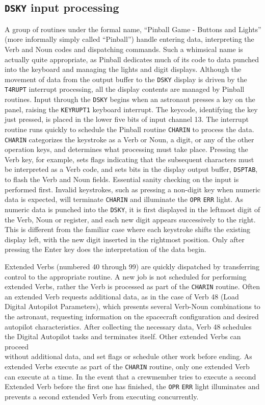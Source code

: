 \documentclass[refcap, oxford]{ahsan}
\begin{document}
\subsection{\texttt{DSKY} input processing}
A group of routines under the formal name, ``Pinball Game - Buttons and Lights'' (more informally simply called ``Pinball'') handle entering data, interpreting the Verb and Noun codes and dispatching commands. Such a whimsical name is actually quite appropriate, as Pinball dedicates much of its code to data punched into the keyboard and managing the lights and digit displays. Although the movement of data from the output buffer to the \texttt{DSKY} display is driven by the \texttt{T4RUPT} interrupt processing, all the display contents are managed by Pinball routines. Input through the \texttt{DSKY} begins when an astronaut presses a key on the panel, raising the \texttt{KEYRUPT1} keyboard interrupt. The keycode, identifying the key just pressed, is placed in the lower five bits of input channel 13. The interrupt routine runs quickly to schedule the Pinball routine \texttt{CHARIN} to process the data. \texttt{CHARIN} categorizes the keystroke as a Verb or Noun, a digit, or any of the other operation keys, and determines what processing must take place. Pressing the Verb key, for example, sets flags indicating that the subsequent characters must be interpreted as a Verb code, and sets bits in the display output buffer, \texttt{DSPTAB}, to flash the Verb and Noun fields. Essential sanity checking on the input is performed first. Invalid keystrokes, such as pressing a non-digit key when numeric data is expected, will terminate \texttt{CHARIN} and illuminate the \texttt{OPR} \texttt{ERR} light. As numeric data is punched into the \texttt{DSKY}, it is first displayed in the leftmost digit of the Verb, Noun or register, and each new digit appears successively to the right. This is different from the familiar case where each keystroke shifts the existing display left, with the new digit inserted in the rightmost position. Only after pressing the Enter key does the interpretation of the data begin.

Extended Verbs (numbered 40 through 99) are quickly dispatched by transferring control to the appropriate routine. A new job is not scheduled for performing extended Verbs, rather the Verb is processed as part of the \texttt{CHARIN} routine. Often an extended Verb requests additional data, as in the case of Verb 48 (Load Digital Autopilot Parameters), which presents several Verb-Noun combinations to the astronaut, requesting information on the spacecraft configuration and desired autopilot characteristics. After collecting the necessary data, Verb 48 schedules the Digital Autopilot tasks and terminates itself. Other extended Verbs can proceed\\
without additional data, and set flags or schedule other work before ending. As extended Verbs execute as part of the \texttt{CHARIN} routine, only one extended Verb can execute at a time. In the event that a crewmember tries to execute a second Extended Verb before the first one has finished, the \texttt{OPR} \texttt{ERR} light illuminates and prevents a second extended Verb from executing concurrently.
\end{document}
